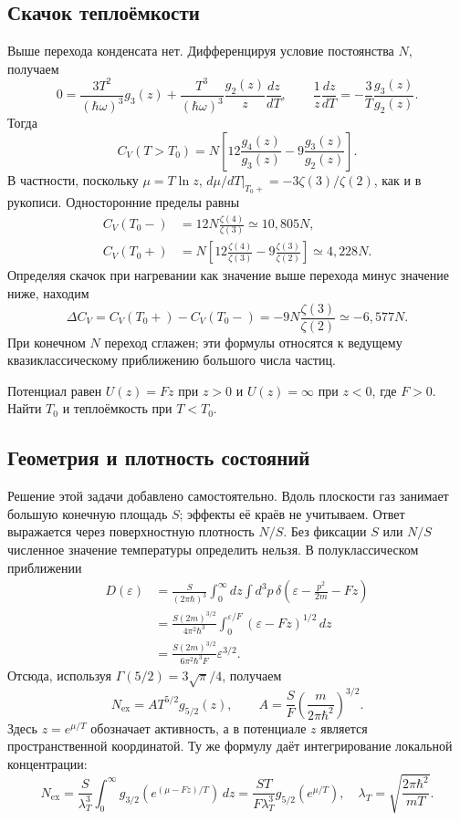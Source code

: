\documentclass[../final.tex]{subfiles}
\begin{document}
\subsection*{Скачок теплоёмкости}
Выше перехода конденсата нет. Дифференцируя условие постоянства $N$,
получаем
\[
 0=\frac{3T^2}{(\hbar\omega)^3}g_3(z)
 +\frac{T^3}{(\hbar\omega)^3}\frac{g_2(z)}{z}\frac{dz}{dT},
 \qquad \frac1z\frac{dz}{dT}=-\frac3T\frac{g_3(z)}{g_2(z)}.
\]
Тогда
\[
 C_V(T>T_0)=N\left[12\frac{g_4(z)}{g_3(z)}
 -9\frac{g_3(z)}{g_2(z)}\right].
\]
В частности, поскольку $\mu=T\ln z$,
$\left.d\mu/dT\right|_{T_0+}=-3\zeta(3)/\zeta(2)$,
как и в рукописи. Односторонние пределы равны
\begin{align*}
 C_V(T_0-)&=12N\frac{\zeta(4)}{\zeta(3)}\simeq10{,}805N,\\
 C_V(T_0+)&=N\left[12\frac{\zeta(4)}{\zeta(3)}
 -9\frac{\zeta(3)}{\zeta(2)}\right]\simeq4{,}228N.
\end{align*}
\answer
Определяя скачок при нагревании как значение выше перехода минус
значение ниже, находим
\[
 \boxed{\Delta C_V=C_V(T_0+)-C_V(T_0-)
 =-9N\frac{\zeta(3)}{\zeta(2)}\simeq-6{,}577N}.
\]
При конечном $N$ переход сглажен; эти формулы относятся к ведущему
квазиклассическому приближению большого числа частиц.

\clearpage
{}
\condition
Потенциал равен $U(z)=Fz$ при $z>0$ и $U(z)=\infty$ при $z<0$,
где $F>0$. Найти $T_0$ и теплоёмкость при $T<T_0$.

\subsection*{Геометрия и плотность состояний}
Решение этой задачи добавлено самостоятельно. Вдоль плоскости газ
занимает большую конечную площадь $S$; эффекты её краёв не учитываем.
Ответ выражается через поверхностную плотность $N/S$. Без фиксации
$S$ или $N/S$ численное значение температуры определить нельзя.
В полуклассическом приближении
\begin{align*}
 D(\varepsilon)
 &=\frac{S}{(2\pi\hbar)^3}\int_0^\infty dz\int d^3p\,
 \delta\left(\varepsilon-\frac{p^2}{2m}-Fz\right)\\
 &=\frac{S(2m)^{3/2}}{4\pi^2\hbar^3}
 \int_0^{\varepsilon/F}(\varepsilon-Fz)^{1/2}\,dz\\
 &=\frac{S(2m)^{3/2}}{6\pi^2\hbar^3F}\varepsilon^{3/2}.
\end{align*}
Отсюда, используя $\Gamma(5/2)=3\sqrt\pi/4$, получаем
\[
 N_{\mathrm{ex}}=A T^{5/2}g_{5/2}(z),\qquad
 A=\frac{S}{F}\left(\frac{m}{2\pi\hbar^2}\right)^{3/2}.
\]
Здесь $z=e^{\mu/T}$ обозначает активность, а в потенциале $z$
является пространственной координатой.
Ту же формулу даёт интегрирование локальной концентрации:
\[
 N_{\mathrm{ex}}=\frac{S}{\lambda_T^3}
 \int_0^\infty g_{3/2}(e^{(\mu-Fz)/T})\,dz
 =\frac{ST}{F\lambda_T^3}g_{5/2}(e^{\mu/T}),\quad
 \lambda_T=\sqrt{\frac{2\pi\hbar^2}{mT}}.
\]
\end{document}
